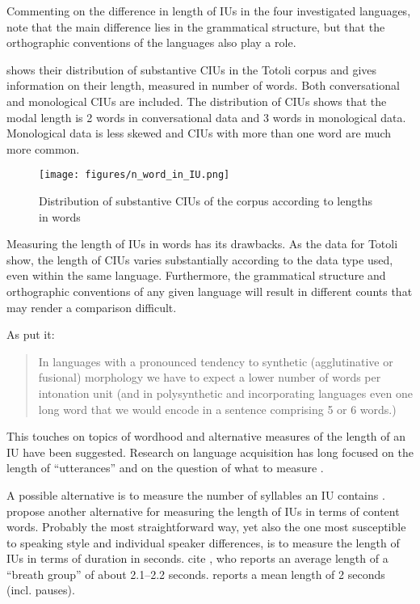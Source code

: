 Commenting on the difference in length of IUs in the four investigated languages, \citet[222]{himmelmann_IP_Universal} note that the main difference lies in the grammatical structure, but that the orthographic conventions of the languages also play a role.

 shows their distribution of substantive CIUs in the Totoli corpus and gives information on their length, measured in number of words. Both conversational and monological CIUs are included. The distribution of CIUs  shows that the modal length  is 2 words in conversational data and 3 words in monological data. Monological data is  less skewed and CIUs with more than one word are much more common. 


\begin{figure}
	\texttt{[image: figures/n\_word\_in\_IU.png]}
	\caption{Distribution of substantive CIUs of the corpus according to lengths in words}
	\label{dist length}
\end{figure}









Measuring the length of IUs in words has its drawbacks. As the data for Totoli show, the length of CIUs varies substantially according to the data type used, even within the same language.
Furthermore, the grammatical structure and orthographic conventions of any given language will result in different counts that may render a comparison difficult.


As \citet[222]{Fenk_Oczlon_2002} put it: 

\begin{quotation}
	In languages with a pronounced tendency to synthetic (agglutinative or
	fusional) morphology we have to expect a lower number of words per intonation
	unit (and in polysynthetic and incorporating languages even one long word that we
	would encode in a sentence comprising 5 or 6 words.)
\end{quotation}


This touches on topics of wordhood  \citep{Tallman} and alternative measures of the length of an IU have been suggested. Research on language acquisition has long focused on the length of “utterances” and on the question of what to measure 
\citep[for an overview of different measures, see][]{Allen_Dench_MLU_2015}. 




A possible alternative is to measure the number of syllables an IU contains \citep[161]{Schuetze-Coburn1994}. \citet{himmelmann_IP_Universal} propose another alternative for measuring the length of IUs in terms of content words. Probably the most straightforward way, yet also the one most susceptible to speaking style and individual speaker differences, is to measure the length of IUs in terms of duration in seconds. \citet[221]{Fenk_Oczlon_2002} cite \citet{maatta1993prosodic}, who reports an average length of a “breath group”  of about 2.1–2.2 seconds. \citet{chafe1980pear} reports a mean length of 2 seconds (incl. pauses).


